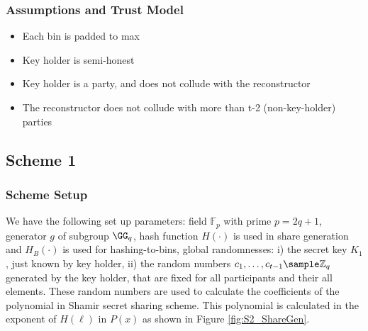 \subsubsection{Assumptions and Trust Model}
\begin{itemize}
    \item Each bin is padded to max
    \item Key holder is semi-honest
    \item Key holder is a party, and does not collude with the reconstructor
    \item The reconstructor does not collude with more than t-2 (non-key-holder)
    parties
\end{itemize}

\subsection{Scheme 1}
\subsubsection{Scheme Setup}
We have the following set up parameters: field $\mathbb{F}_p$ with prime $p = 2q + 1$, generator $g$ of subgroup $\GG_q$, hash function $H(\cdot)$ is used in share generation and $H_B(\cdot)$ is used for hashing-to-bins, global randomnesses: i) the secret key $K_1$, just known by key holder, ii) the random numbers $c_1, \ldots, c_{t-1} \sample \mathbb{Z}_{q}$ generated by the key holder, that are fixed for all participants and their all elements. These random numbers are used to calculate the coefficients of the polynomial in Shamir secret sharing scheme. This polynomial is calculated in the exponent of $H(\ell)$ in $P(x)$ as shown in Figure \ref{fig:S2_ShareGen}.

